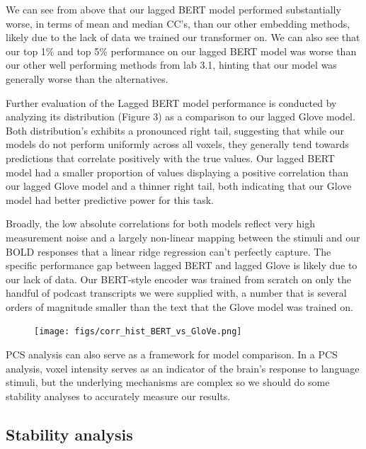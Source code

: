 \documentclass{article}
\begin{document}
We can see from above that our lagged BERT model performed substantially worse, in terms of mean and median CC's, than our other embedding methods, likely due to the lack of data we trained our transformer on. We can also see that our top 1\% and top 5\% performance on our lagged BERT model was worse than our other well performing methods from lab 3.1, hinting that our model was generally worse than the alternatives. 

Further evaluation of the Lagged BERT model performance is conducted by analyzing its distribution (Figure 3) as a comparison to our lagged Glove model. Both distribution's exhibits a pronounced right tail, suggesting that while our models do not perform uniformly across all voxels, they generally tend towards predictions that correlate positively with the true values. Our lagged BERT model had a smaller proportion of values displaying a positive correlation than our lagged Glove model and a thinner right tail, both indicating that our Glove model had better predictive power for this task. 

Broadly, the low absolute correlations for both models reflect very high measurement noise and a largely non-linear mapping between the stimuli and our BOLD responses that a linear ridge regression can't perfectly capture. The specific performance gap between lagged BERT and lagged Glove is likely due to our lack of data. Our BERT-style encoder was trained from scratch on only the handful of podcast transcripts we were supplied with, a number that is several orders of magnitude smaller than the text that the Glove model was trained on. 


\begin{figure}[H]
\centering
\captionsetup{width=\textwidth}
\texttt{[image: figs/corr\_hist\_BERT\_vs\_GloVe.png]}
\label{fig:dist}
\end{figure}

PCS analysis can also serve as a framework for model comparison. In a PCS analysis, voxel intensity serves as an indicator of the brain's response to language stimuli, but the underlying mechanisms are complex so we should do some stability analyses to accurately measure our results.

\subsection{Stability analysis}
\end{document}

